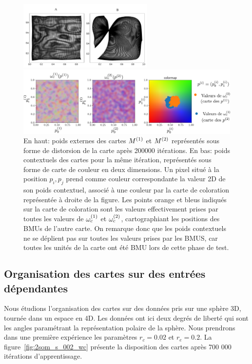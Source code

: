 \documentclass[../main]{subfiles}
\begin{document}
\begin{figure}
	\begin{minipage}{\textwidth}
		\centering\includegraphics[width=0.6\textwidth]{we_cub_example.pdf}
	\end{minipage}
	\begin{minipage}{\textwidth}
		\includegraphics[width=\textwidth]{wc_cub_legend.pdf}
		\caption{En haut: poids externes des cartes $M^{({1})}$ et $M^{({2})}$ représentés sous forme de distorsion de la carte après 200000 itérations.
	En bas: poids contextuels des cartes pour la même itération, représentés sous forme de carte de couleur en deux dimensions. Un pixel situé à la position $p_i,p_j$ prend comme couleur correspondante la valeur 2D de son poids contextuel, associé à une couleur par la carte de coloration représentée à droite de la figure.
	Les points orange et bleus indiqués sur la carte de coloration sont les valeurs effectivement prises par toutes les valeurs de $\omega_c^{(1)}$ et $\omega_c^{(2)}$, cartographiant les positions des BMUs de l'autre carte.
	On remarque donc que les poids contextuels ne se déplient pas sur toutes les valeurs prises par les BMUS, car toutes les unités de la carte ont été BMU lors de cette phase de test.\label{fig:2som_cub_wc}}
	\end{minipage}
\end{figure}


\subsection{Organisation des cartes sur des entrées dépendantes}

Nous étudions l'organisation des cartes sur des données pris sur une sphère 3D, tournée dans un espace en 4D. Les données ont ici deux degrés de liberté qui sont les angles paramétrant la représentation polaire de la sphère.
Nous prendrons dans une première expérience les paramètres $r_c = 0.02$ et $r_e = 0.2$.
La figure~\ref{fig:2som_s_002_wc} présente la disposition des cartes après 700 000 itérations d'apprentissage. 
\end{document}
